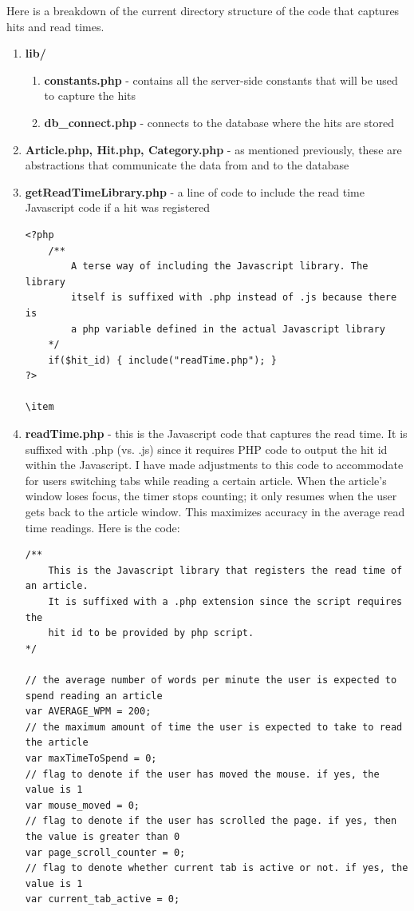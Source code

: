 \documentclass[12pt]{article}
\begin{document}
\noindent Here is a breakdown of the current directory structure of the code that captures hits and read times.
\begin{enumerate}
\item \textbf{lib/}
\begin{enumerate}
\item \textbf{constants.php} - contains all the server-side constants that will be used to capture the hits
\item \textbf{db\_connect.php} - connects to the database where the hits are stored
\end{enumerate}
\item \textbf{Article.php, Hit.php, Category.php} - as mentioned previously, these are abstractions that communicate the data from and to the database
\item \textbf{getReadTimeLibrary.php} - a line of code to include the read time Javascript code if a hit was registered
\begin{lstlisting}[basicstyle=\scriptsize]
<?php 
	/**
		A terse way of including the Javascript library. The library 
		itself is suffixed with .php instead of .js because there is 
		a php variable defined in the actual Javascript library
	*/
	if($hit_id) { include("readTime.php"); } 
?>

\item
\end{lstlisting}
\item \textbf{readTime.php} - this is the Javascript code that captures the read time. It is suffixed with .php (vs. .js) since it requires PHP code to output the hit id within the Javascript. I have made adjustments to this code to accommodate for users switching tabs while reading a certain article. When the article's window loses focus, the timer stops counting; it only resumes when the user gets back to the article window. This maximizes accuracy in the average read time readings. Here is the code:
\begin{lstlisting}[basicstyle=\scriptsize]
/**
	This is the Javascript library that registers the read time of an article.
	It is suffixed with a .php extension since the script requires the 
	hit id to be provided by php script.
*/

// the average number of words per minute the user is expected to spend reading an article
var AVERAGE_WPM = 200;
// the maximum amount of time the user is expected to take to read the article
var maxTimeToSpend = 0;
// flag to denote if the user has moved the mouse. if yes, the value is 1
var mouse_moved = 0;
// flag to denote if the user has scrolled the page. if yes, then the value is greater than 0
var page_scroll_counter = 0;
// flag to denote whether current tab is active or not. if yes, the value is 1
var current_tab_active = 0;


\end{lstlisting}
\end{enumerate}
\end{document}
